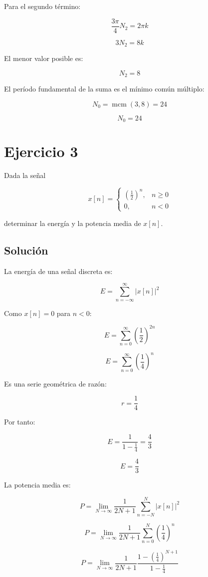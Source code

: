 \documentclass[fleqn]{article}
\begin{document}
	Para el segundo término:

	\[
	\frac{3\pi}{4}N_2
	=
	2\pi k
	\]

	\[
	3N_2=8k
	\]

	El menor valor posible es:

	\[
	N_2=8
	\]

	El período fundamental de la suma es el mínimo común múltiplo:

	\[
	N_0
	=
	\operatorname{mcm}(3,8)
	=
	24
	\]

	\[
	\boxed{
	N_0=24
	}
	\]

\section{Ejercicio 3}
	Dada la señal

	\[
	x[n]=
	\begin{cases}
	\left(\frac{1}{2}\right)^n, & n\geq0 \\[1mm]
	0, & n<0
	\end{cases}
	\]

	determinar la energía y la potencia media de $x[n]$.

	\subsection{Solución}

	La energía de una señal discreta es:

	\[
	E
	=
	\sum_{n=-\infty}^{\infty}
	|x[n]|^2
	\]

	Como $x[n]=0$ para $n<0$:

	\[
	E
	=
	\sum_{n=0}^{\infty}
	\left(\frac{1}{2}\right)^{2n}
	\]

	\[
	E
	=
	\sum_{n=0}^{\infty}
	\left(\frac{1}{4}\right)^n
	\]

	Es una serie geométrica de razón:

	\[
	r=\frac{1}{4}
	\]

	Por tanto:

	\[
	E
	=
	\frac{1}{1-\frac{1}{4}}
	=
	\frac{4}{3}
	\]

	\[
	\boxed{
	E=\frac{4}{3}
	}
	\]

	La potencia media es:

	\[
	P
	=
	\lim_{N\to\infty}
	\frac{1}{2N+1}
	\sum_{n=-N}^{N}
	|x[n]|^2
	\]

	\[
	P
	=
	\lim_{N\to\infty}
	\frac{1}{2N+1}
	\sum_{n=0}^{N}
	\left(\frac{1}{4}\right)^n
	\]

	\[
	P
	=
	\lim_{N\to\infty}
	\frac{1}{2N+1}
	\frac{1-\left(\frac{1}{4}\right)^{N+1}}
	{1-\frac{1}{4}}
	\]
\end{document}
